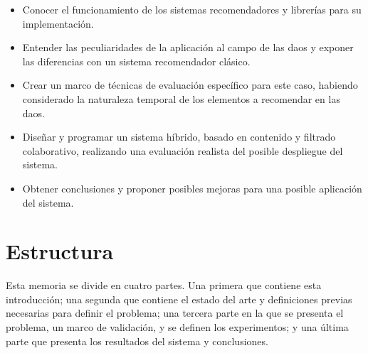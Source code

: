 \begin{itemize}
    \item Conocer el funcionamiento de los sistemas recomendadores y librerías para su implementación.
    \item Entender las peculiaridades de la aplicación al campo de las \glspl{dao} y exponer las diferencias con un sistema recomendador clásico.
    \item Crear un marco de técnicas de evaluación específico para este caso, habiendo considerado la naturaleza temporal de los elementos a recomendar en las \glspl{dao}.
    \item Diseñar y programar un sistema híbrido, basado en contenido y filtrado colaborativo, realizando una evaluación realista del posible despliegue del sistema.
    \item Obtener conclusiones y proponer posibles mejoras para una posible aplicación del sistema.
\end{itemize}

\section{Estructura}

Esta memoria se divide en cuatro partes. Una primera que contiene esta introducción; una segunda que contiene el estado del arte y definiciones previas necesarias para definir el problema; una tercera parte en la que se presenta el problema, un marco de validación, y se definen los experimentos; y una última parte que presenta los resultados del sistema y conclusiones.

